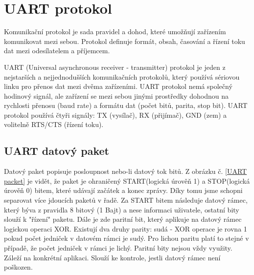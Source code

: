 

\section{UART protokol}
Komunikační protokol je sada pravidel a dohod, které umožňují zařízením komunikovat mezi sebou. Protokol definuje formát, obsah, časování a řízení toku dat mezi odesílatelem a příjemcem.

UART (Universal asynchronous receiver - transmitter) protokol je jeden z nejstarších a nejjednodušších komunikačních protokolů, který používá sériovou linku pro přenos dat mezi dvěma zařízeními. UART protokol nemá společný hodinový signál, ale zařízení se mezi sebou jinými prostředky dohodnou na rychlosti přenosu (baud rate) a formátu dat (počet bitů, parita, stop bit). UART protokol používá čtyři signály: TX (vysílač), RX (přijímač), GND (zem) a volitelně RTS/CTS (řízení toku). \cite{ser kom} %

\subsection{UART datový paket}
\label{UARTt}
Datový paket popisuje posloupnost nebo-li datový tok bitů. Z obrázku č. \ref{UART packet} je vidět, že paket je ohraničený START(logická úrověň 1) a STOP(logická úrověň 0) bitem, které udávají začátek a konec zprávy. Díky tomu jsme schopni separovat více jdoucích paketů v řadě. Za START bitem následuje datový rámec, který býva z pravidla 8 bitový (1 Bajt) a nese informaci uživatele, ostatní bity slouží k "řízení" paketu. Dále je zde paritní bit, který aplikuje na datový rámec logickou operaci XOR. Existují dva druhy parity: sudá - XOR operace je rovna 1 pokud počet jedniček v datovém rámci je sudý.  Pro lichou paritu platí to stejné v případě, že počet jedniček v rámci je lichý. Paritní bity nejsou vždy využity. Záleží na konkrétní aplikaci. Slouží ke kontrole, jestli datový rámec není poškozen. \cite{ser kom} %

